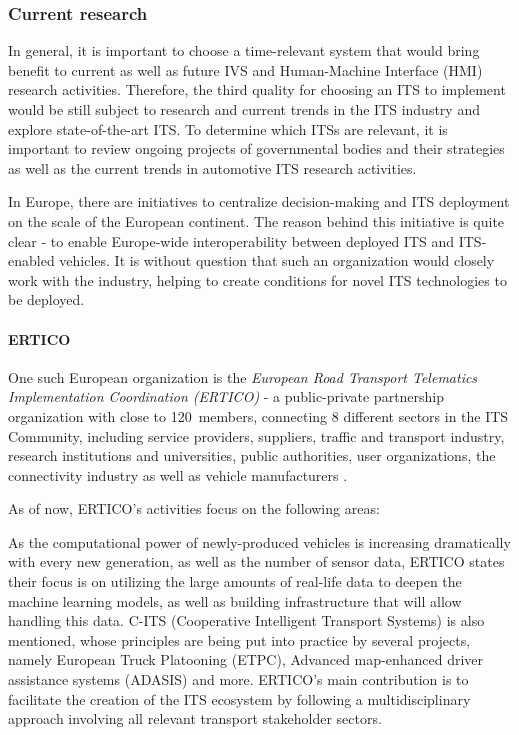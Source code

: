 \documentclass[0main.tex]{subfiles}
\begin{document}
\subsubsection{Current research}\label{sec-research}

In general, it is important to choose a time-relevant system that would bring benefit to
current as well as future IVS and Human-Machine Interface (HMI) research activities. Therefore,
the third quality for choosing an ITS to implement would be still subject to research and
current trends in the ITS industry and explore state-of-the-art ITS. To determine which ITSs
are relevant, it is important to review ongoing projects of governmental bodies and their
strategies as well as the current trends in automotive ITS research activities.

In Europe, there are initiatives to centralize decision-making and ITS deployment on the scale of 
the European continent. The reason behind this initiative is quite clear - to enable Europe-wide 
interoperability between deployed ITS and ITS-enabled vehicles. It is without question that 
such an organization would closely work with the industry, helping to create conditions for novel 
ITS technologies to be deployed.

\paragraph{ERTICO}

One such European organization is the \emph{European Road Transport Telematics
Implementation Coordination (ERTICO)} - a public-private partnership organization
with close to 120~members, connecting 8 different sectors in the ITS Community, including
service providers, suppliers, traffic and transport industry, research institutions and
universities, public authorities, user organizations, the connectivity industry as well as
vehicle manufacturers \cite{ertico}.

As of now, ERTICO's activities focus on the following areas:

As the computational power of newly-produced vehicles is increasing dramatically with every 
new generation, as well as the number of sensor data, ERTICO states their focus is on utilizing 
the large amounts of real-life data to deepen the machine learning models, as well as building 
infrastructure that will allow handling this data. C-ITS (Cooperative Intelligent Transport
Systems) is also mentioned, whose principles are being put into practice by several projects, 
namely European Truck Platooning (ETPC), Advanced map-enhanced driver assistance systems (ADASIS) and 
more. ERTICO's main contribution is to facilitate the creation of the ITS ecosystem by following a
multidisciplinary approach involving all relevant transport stakeholder sectors.
\end{document}
